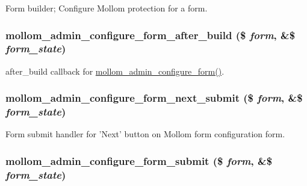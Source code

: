 Form builder; Configure Mollom protection for a form. \hypertarget{mollom_8admin_8inc_0565a3a427b7f3caee16a2ff658e77aa}{
\subsubsection[{mollom\_\-admin\_\-configure\_\-form\_\-after\_\-build}]{\setlength{\rightskip}{0pt plus 5cm}mollom\_\-admin\_\-configure\_\-form\_\-after\_\-build (\$ {\em form}, \/  \&\$ {\em form\_\-state})}}
\label{mollom_8admin_8inc_0565a3a427b7f3caee16a2ff658e77aa}


after\_\-build callback for \hyperlink{mollom_8admin_8inc_ef4774c8636c4437de390854c58b5852}{mollom\_\-admin\_\-configure\_\-form()}. \hypertarget{mollom_8admin_8inc_4aa055b2b342650e86e6ecb46c92e5e2}{
\subsubsection[{mollom\_\-admin\_\-configure\_\-form\_\-next\_\-submit}]{\setlength{\rightskip}{0pt plus 5cm}mollom\_\-admin\_\-configure\_\-form\_\-next\_\-submit (\$ {\em form}, \/  \&\$ {\em form\_\-state})}}
\label{mollom_8admin_8inc_4aa055b2b342650e86e6ecb46c92e5e2}


Form submit handler for 'Next' button on Mollom form configuration form. \hypertarget{mollom_8admin_8inc_c2080295728d878025a0ed4c37cfc811}{
\subsubsection[{mollom\_\-admin\_\-configure\_\-form\_\-submit}]{\setlength{\rightskip}{0pt plus 5cm}mollom\_\-admin\_\-configure\_\-form\_\-submit (\$ {\em form}, \/  \&\$ {\em form\_\-state})}}
\label{mollom_8admin_8inc_c2080295728d878025a0ed4c37cfc811}


